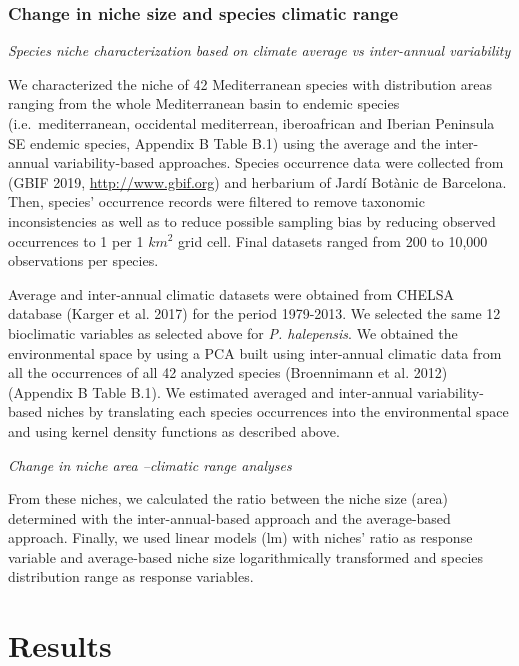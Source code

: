 \documentclass[11pt,twoside]{reedthesis}
\begin{document}
\subsubsection{Change in niche size and species climatic
range}\label{change-in-niche-size-and-species-climatic-range}

\setlength{\parindent}{0pt} \emph{Species niche characterization based
on climate average vs inter-annual variability}\par

We characterized the niche of 42 Mediterranean species with distribution
areas ranging from the whole Mediterranean basin to endemic species
(i.e.~mediterranean, occidental mediterrean, iberoafrican and Iberian
Peninsula SE endemic species, Appendix B Table B.1) using the average
and the inter-annual variability-based approaches. Species occurrence
data were collected from (GBIF 2019, \url{http://www.gbif.org}) and
herbarium of Jardí Botànic de Barcelona. Then, species' occurrence
records were filtered to remove taxonomic inconsistencies as well as to
reduce possible sampling bias by reducing observed occurrences to 1 per
1 \(km^2\) grid cell. Final datasets ranged from 200 to 10,000
observations per species.\par
\setlength{\parindent}{30pt} Average and inter-annual climatic datasets
were obtained from CHELSA database (Karger et al. 2017) for the period
1979-2013. We selected the same 12 bioclimatic variables as selected
above for \emph{P. halepensis}. We obtained the environmental space by
using a PCA built using inter-annual climatic data from all the
occurrences of all 42 analyzed species (Broennimann et al. 2012)
(Appendix B Table B.1). We estimated averaged and inter-annual
variability-based niches by translating each species occurrences into
the environmental space and using kernel density functions as described
above.\par
\setlength{\parindent}{0pt} \emph{Change in niche area --climatic range
analyses}\par

From these niches, we calculated the ratio between the niche size (area)
determined with the inter-annual-based approach and the average-based
approach. Finally, we used linear models (lm) with niches' ratio as
response variable and average-based niche size logarithmically
transformed and species distribution range as response variables.\par
\setlength{\parindent}{30pt}

\section{Results}\label{results-1}
\end{document}
